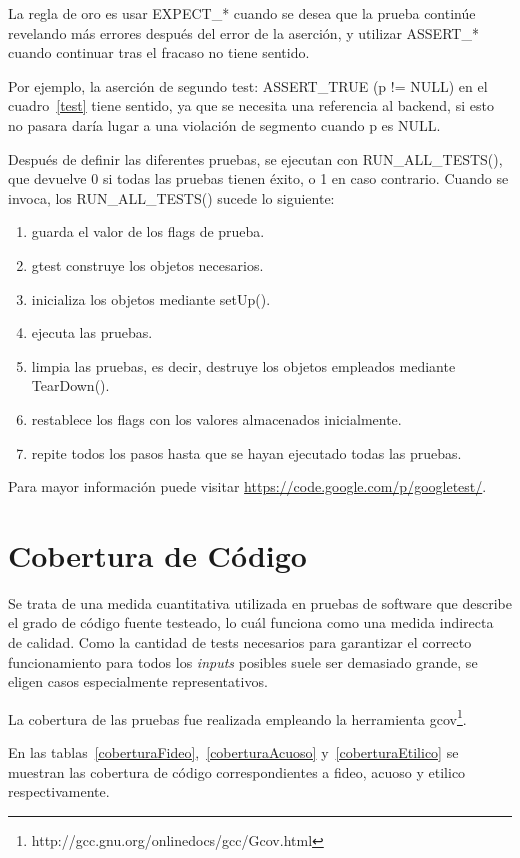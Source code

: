 \par La regla de oro es usar EXPECT\_* cuando se desea que la prueba continúe revelando más errores después del error de la aserción, y utilizar ASSERT\_* cuando continuar tras el fracaso no tiene sentido.

\par Por ejemplo, la aserción de segundo test: ASSERT\_TRUE (p != NULL) en el cuadro~\ref{test} tiene sentido, ya que se necesita una referencia al backend, si esto no pasara daría lugar a una violación de segmento cuando p es NULL.

\par Después de definir las diferentes pruebas, se ejecutan con RUN\_ALL\_TESTS(), que devuelve 0 si todas las pruebas tienen éxito, o 1 en caso contrario. Cuando se invoca, los RUN\_ALL\_TESTS() sucede lo siguiente:

\begin{enumerate}
	\item guarda el valor de los flags de prueba.
	\item gtest construye los objetos necesarios.
	\item inicializa los objetos mediante setUp().
	\item ejecuta las pruebas.
	\item limpia las pruebas, es decir, destruye los objetos empleados mediante TearDown().
	\item restablece los flags con los valores almacenados inicialmente.
	\item repite todos los pasos hasta que se hayan ejecutado todas las pruebas.
\end{enumerate}

Para mayor información puede visitar \url{https://code.google.com/p/googletest/}.

\section{Cobertura de Código}
\par Se trata de una medida cuantitativa utilizada en pruebas de software que describe el grado de código fuente testeado, lo cuál funciona como una medida indirecta de calidad. Como la cantidad de tests necesarios para garantizar el correcto funcionamiento para todos los \textit{inputs} posibles suele ser demasiado grande, se eligen casos especialmente representativos. 
\par La cobertura de las pruebas fue realizada empleando la herramienta gcov\footnote{http://gcc.gnu.org/onlinedocs/gcc/Gcov.html}. 
\par En las tablas~\ref{coberturaFideo},~\ref{coberturaAcuoso} y~\ref{coberturaEtilico} se muestran las cobertura de código correspondientes a fideo, acuoso y etilico respectivamente.


